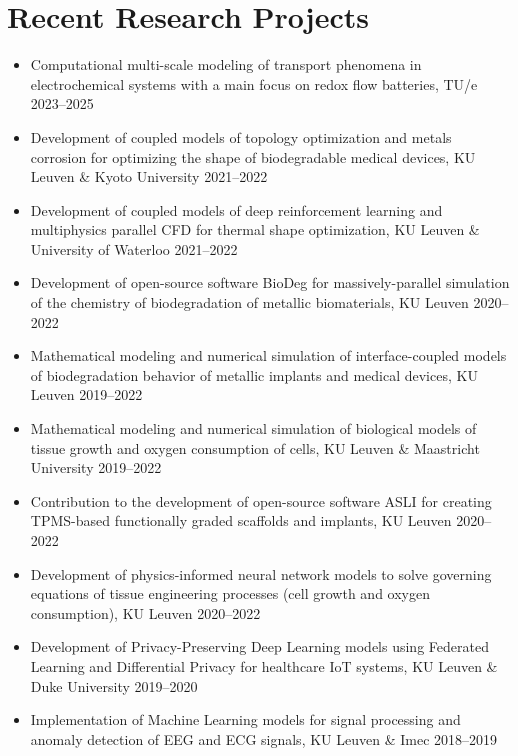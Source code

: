 \documentclass{cv}
\begin{document}
%

\section{Recent Research Projects}

\begin{itemize} [itemsep=-0.2ex]
\item
Computational multi-scale modeling of transport phenomena in electrochemical systems with a main focus on redox flow batteries, {TU/e} \hfill 2023--2025
\item
Development of coupled models of topology optimization and metals corrosion for optimizing the shape of biodegradable medical devices, {KU Leuven \& Kyoto University} \hfill 2021--2022
\item
Development of coupled models of deep reinforcement learning and multiphysics parallel CFD for thermal shape optimization, KU Leuven \& University of Waterloo \hfill 2021--2022
\item
Development of open-source software BioDeg for massively-parallel simulation of the chemistry of biodegradation of metallic biomaterials, {KU Leuven} \hfill 2020--2022
\item
Mathematical modeling and numerical simulation of interface-coupled models of biodegradation behavior of metallic implants and medical devices, {KU Leuven} \hfill 2019--2022
\item
Mathematical modeling and numerical simulation of biological models of tissue growth and oxygen consumption of cells, {KU Leuven} \& Maastricht University \hfill 2019--2022
\item 
Contribution to the development of open-source software ASLI for creating TPMS-based functionally graded scaffolds and implants, KU Leuven \hfill 2020--2022
\item
Development of physics-informed neural network models to solve governing equations of tissue engineering processes (cell growth and oxygen consumption), {KU Leuven} \hfill 2020--2022
\item
Development of Privacy-Preserving Deep Learning models using Federated Learning and Differential Privacy for healthcare IoT systems, {KU Leuven \& Duke University} \hfill 2019--2020
\item
Implementation of Machine Learning models for signal processing and anomaly detection of EEG and ECG signals, {KU Leuven \& Imec} \hfill 2018--2019
\end{itemize}
\end{document}
